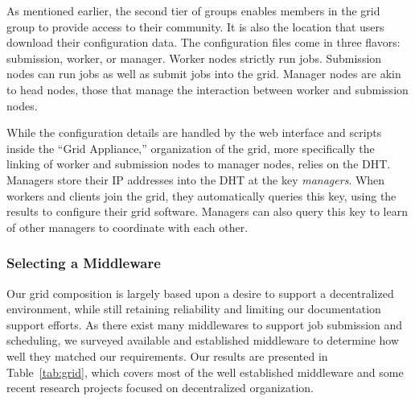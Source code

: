 \documentclass[conference]{IEEEtran}
\begin{document}
As mentioned earlier, the second tier of groups enables members in the grid
group to provide access to their community.  It is also the location that users
download their configuration data.  The configuration files come in three
flavors: submission, worker, or manager.  Worker nodes strictly run jobs.
Submission nodes can run jobs as well as submit jobs into the grid.  Manager
nodes are akin to head nodes, those that manage the interaction between worker
and submission nodes.

While the configuration details are handled by the web interface and scripts
inside the ``Grid Appliance,'' organization of the grid, more specifically the
linking of worker and submission nodes to manager nodes, relies on the DHT.
Managers store their IP addresses into the DHT at the key \emph{managers}.
When workers and clients join the grid, they automatically queries this key,
using the results to configure their grid software.  Managers can also query
this key to learn of other managers to coordinate with each other.

\subsubsection{Selecting a Middleware}

Our grid composition is largely based upon a desire to support a decentralized
environment, while still retaining reliability and limiting our documentation
support efforts.  As there exist many middlewares to support job submission and
scheduling, we surveyed available and established middleware to determine how
well they matched our requirements.  Our results are presented in
Table~\ref{tab:grid}, which covers most of the well established middleware and
some recent research projects focused on decentralized organization.
\end{document}
